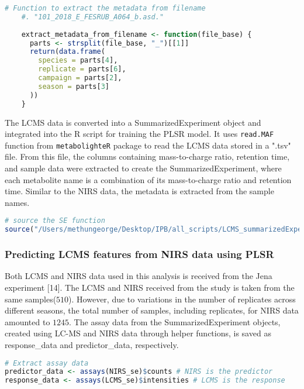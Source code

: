 \documentclass[12pt,a4paper]{report}
\begin{document}
\begin{lstlisting}[language=R, style=mystyle]
# Function to extract the metadata from filename
    #. "101_2018_E_FESRUB_A064_b.asd."
    
    extract_metadata_from_filename <- function(file_base) {
      parts <- strsplit(file_base, "_")[[1]]
      return(data.frame(
        species = parts[4],
        replicate = parts[6],
        campaign = parts[2],
        season = parts[3]
      ))
    }
\end{lstlisting}


The LCMS data is converted into a SummarizedExperiment object and integrated into the R script for training the PLSR model. It uses \texttt{read.MAF} function from \texttt{metabolighteR} package to read the LCMS data stored in a ".tsv" file. From this file, the columns containing mass-to-charge ratio, retention time, and sample data were extracted to create the SummarizedExperiment, where each metabolite name is a combination of its mass-to-charge ratio and retention time. Similar to the NIRS data, the metadata is extracted from the sample names. \\

\begin{lstlisting}[language=R, style=mystyle]
# source the SE function
source("/Users/methungeorge/Desktop/IPB/all_scripts/LCMS_summarizedExperiment.R")
\end{lstlisting}

\subsubsection*{Predicting LCMS features from NIRS data using PLSR}
Both LCMS and NIRS data used in this analysis is received from the Jena experiment [14]. The LCMS and NIRS received from the study is taken from the same samples($510$). However, due to variations in the number of replicates across different seasons, the total number of samples, including replicates, for NIRS data amounted to $1245$. The assay data from the SummarizedExperiment objects, created using LC-MS and NIRS data through helper functions, is saved as response\_data and predictor\_data, respectively. \\

\begin{lstlisting}[language=R, style=mystyle]
# Extract assay data
predictor_data <- assays(NIRS_se)$counts # NIRS is the predictor
response_data <- assays(LCMS_se)$intensities # LCMS is the response
\end{lstlisting}
\end{document}
